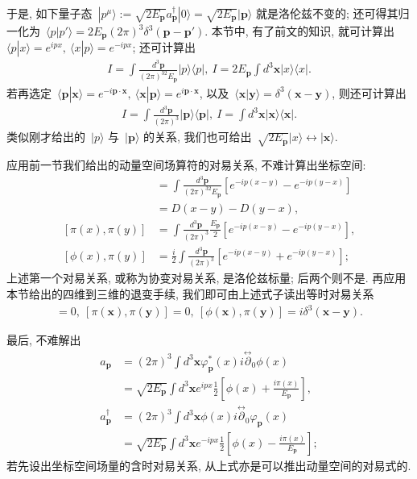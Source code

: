 %
于是, 如下量子态~$|p^\mu\rangle:=\sqrt{2E_{\bm{p}}}a^\dag_{\bm{p}}|0\rangle=\sqrt{2E_{\bm{p}}}|\bm{p}\rangle$ 就是洛伦兹不变的; 还可得其归一化为~$\langle p|p'\rangle=2E_{\bm{p}}(2\pi)^3\delta^3(\bm{p}-\bm{p}')$. 本节中, 有了前文的知识, 就可计算出~$\langle p|x\rangle=e^{ipx},~\langle x|p\rangle=e^{-ipx}$; 还可计算出
\begin{gather}
I=\int\frac{d^3\bm{p}}{(2\pi)^32E_{\bm{p}}}|p\rangle\langle p|,~I=2E_{\bm{p}}\int d^3\bm{x}|x\rangle\langle x|.
\end{gather}
若再选定~$\langle \bm{p}|\bm{x}\rangle=e^{-i\bm{p}\cdot\bm{x}},~\langle \bm{x}|\bm{p}\rangle=e^{i\bm{p}\cdot\bm{x}}$, 以及~$\langle\bm{x}|\bm{y}\rangle=\delta^3(\bm{x}-\bm{y})$, 则还可计算出
\begin{gather}
I=\int\frac{d^3\bm{p}}{(2\pi)^3}|\bm{p}\rangle\langle\bm{p}|,~I=\int d^3\bm{x}|\bm{x}\rangle\langle\bm{x}|.
\end{gather}
类似刚才给出的~$|p\rangle$ 与~$|\bm{p}\rangle$ 的关系, 我们也可给出~$\sqrt{2E_{\bm{p}}}|x\rangle\leftrightarrow|\bm{x}\rangle$.


应用前一节我们给出的动量空间场算符的对易关系, 不难计算出坐标空间:
\begin{align}
[\phi(x),\phi(y)]&=\int\frac{d^3\bm{p}}{(2\pi)^32E_{\bm{p}}}\left[e^{-ip(x-y)}-e^{-ip(y-x)}\right]\nonumber\\
&=D(x-y)-D(y-x),\\
[\pi(x),\pi(y)]&=\int\frac{d^3\bm{p}}{(2\pi)^3}\frac{E_{\bm{p}}}{2}\left[e^{-ip(x-y)}-e^{-ip(y-x)}\right],\\
[\phi(x),\pi(y)]&=\frac{i}{2}\int\frac{d^3\bm{p}}{(2\pi)^3}\left[e^{-ip(x-y)}+e^{-ip(y-x)}\right];
\end{align}
上述第一个对易关系, 或称为协变对易关系, 是洛伦兹标量; 后两个则不是. 再应用本节给出的四维到三维的退变手续, 我们即可由上述式子读出等时对易关系
\begin{align}
[\phi(\bm{x}),\phi(\bm{y})]=0,~[\pi(\bm{x}),\pi(\bm{y})]=0,~[\phi(\bm{x}),\pi(\bm{y})]=i\delta^3(\bm{x}-\bm{y}).
\end{align}

最后, 不难解出
\begin{align}
a_{\bm{p}}&=(2\pi)^3\int d^3\bm{x}\varphi^*_{\bm{p}}(x)i\overset{\leftrightarrow}{\partial}_0\phi(x)\nonumber\\
&=\sqrt{2E_{\bm{p}}}\int d^3\bm{x}e^{ipx}\frac{1}{2}\left[\phi(x)+\frac{i\pi(x)}{E_{\bm{p}}}\right],\\
a^\dag_{\bm{p}}&=(2\pi)^3\int d^3\bm{x}\phi(x)i\overset{\leftrightarrow}{\partial}_0\varphi_{\bm{p}}(x)\nonumber\\
&=\sqrt{2E_{\bm{p}}}\int d^3\bm{x}e^{-ipx}\frac{1}{2}\left[\phi(x)-\frac{i\pi(x)}{E_{\bm{p}}}\right];
\end{align}
若先设出坐标空间场量的含时对易关系, 从上式亦是可以推出动量空间的对易式的.


